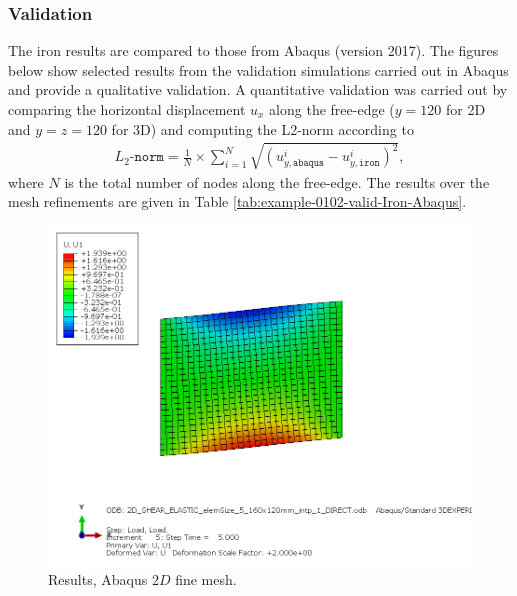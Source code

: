 \subsubsection{Validation}
%


%
The iron results are compared to those from Abaqus (version 2017).
The figures below show selected results from the validation simulations carried
out in Abaqus and provide a qualitative validation. A quantitative validation
was carried out by comparing the horizontal displacement $u_x$
along the free-edge ($y=120$ for 2D and $y=z=120$ for 3D)
and computing the L2-norm according to
\begin{align}
    L_2\texttt{-norm} = \frac{1}{N} \times \sum_{i=1}^{N} \sqrt{\left(u_{y,\texttt{abaqus}}^i-u_{y,\texttt{iron}}^i  \right)^2},
\end{align}
where $N$ is the total number of nodes along the free-edge.
The results over the mesh refinements are given in
Table \ref{tab:example-0102-valid-Iron-Abaqus}.
%
\begin{figure}[h!]
    \centering 
    \includegraphics[width=\columnwidth]{examples/example-0102/doc/figures/2D_SHEAR_ELASTIC_elemSize_5_160x120mm_intp_1_DIRECTU1.png} 
    \caption{Results, Abaqus $2D$ fine mesh.}
    \label{example-0102-abaqus-2D-fig}
\end{figure}
%
